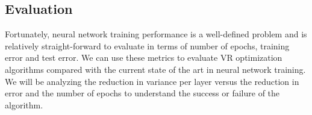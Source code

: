 \documentclass{article} %
\begin{document}
\subsection{Evaluation}
Fortunately, neural network training performance is a well-defined problem and is relatively straight-forward to evaluate in terms of number of epochs, training error and test error. We can use these metrics to evaluate VR optimization algorithms compared with the current state of the art in neural network training. We will be analyzing the reduction in variance per layer versus the reduction in error and the number of epochs to understand the success or failure of the algorithm.




\end{document}
